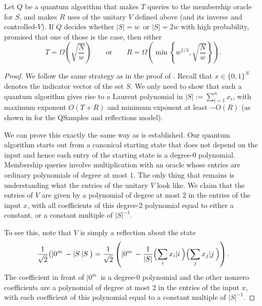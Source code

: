 \begin{theorem} \label{thm:finalthm} \label{thm:unitary}
Let $Q$ be a quantum algorithm that makes $T$ queries to the membership oracle for $S$,
and makes $R$ uses of the unitary $V$ defined above (and its inverse and controlled-$V$).
If $Q$ decides whether $\left\vert S\right\vert =w$\ or $\left\vert S\right\vert =2w$
with high probability, promised that one of those is the case, then either
\begin{equation}
T=\Omega\left(  \sqrt{\frac{N}{w}}\right)  \qquad \textrm{or} \qquad
R=\Omega\left(  \min\left\{  w^{1/3},\sqrt{\frac{N}{w}}\right\}  \right).
\end{equation}
\end{theorem}
\begin{proof}
We follow the same strategy as in
the proof of . Recall that $x \in \{0, 1\}^N$ denotes the indicator vector of the set $S$. We only need to show that such a quantum algorithm gives rise to a Laurent polynomial in $|S|:=\sum_{i=1}^n x_i$, with maximum exponent $O(T+R)$ and minimum exponent at least $-O(R)$ (as shown in  for the QSamples and reflections model).

We can prove this exactly the same way as  is established. Our quantum algorithm starts out from a canonical starting state that does not depend on the input and hence each entry of the starting state is a degree-$0$ polynomial.
Membership queries involve multiplication with an oracle whose entries are ordinary polynomials of degree at most $1$. The only thing that remains is understanding what the entries of the unitary $V$ look like. We claim that the entries of $V$ are given
by a polynomial of degree at most 2 in the entries of the input $x$,
with all coefficients of this degree-2 polynomial equal
to either a constant, or a constant multiple of $|S|^{-1}$.

To see this, note that $V$ is simply a reflection about the state
\begin{equation}
    \frac{1}{\sqrt{2}}\bigl(|0^m\>-|S\>|S\>\bigr)
    = \frac{1}{\sqrt{2}}\left(|0^m\>-\frac{1}{|S|}\Bigl(\sum_{i}x_i|i\>\Bigr)\Bigl(\sum_{j}x_j|j\>\Bigr)
    \right).
\end{equation} 
The coefficient in front of $|0^m\>$ is a degree-$0$ polynomial and the other nonzero coefficients are
a polynomial of degree at most 2 in the entries of the input $x$, with each coefficient of this polynomial equal to a constant multiple of $|S|^{-1}$.


\end{proof}
